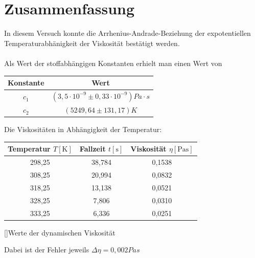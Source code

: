 \documentclass[12pt,a4paper,]{scrreprt}
\begin{document}
\pagebreak
	
	
    
    
	\chapter{Zusammenfassung}
In diesem Versuch konnte die Arrhenius-Andrade-Beziehung der expotentiellen Temperaturabhänigkeit der Viskosität bestätigt werden. \\
\\
Als Wert der stoffabhängigen Konstanten erhielt man einen Wert von
\begin{center}
\begin{tabular}{c|c}
Konstante & Wert \\ \hline
$c_1$ & $(3,5 \cdot 10^{-9} \pm 0,33 \cdot 10^{-9}) Pa \cdot s $ \\
$c_2$ &  $(5249,64 \pm 131,17) K $\\
\end{tabular}
\end{center}

Die Viskositäten in Abhängigkeit der Temperatur:
\begin{center}
   \begin{tabular}{c|c|c}
  		Temperatur $T [\si{\kelvin}]$ & Fallzeit $t [\si{\second}]$ & Viskosität $\eta [\si{\pascal\second}]$ \\ \hline \hline
        298,25 & 38,784	& 0,1538 \\
		308,25 & 20,994	& 0,0832 \\
		318,25 & 13,138	& 0,0521 \\
		328,25 & 7,806	& 0,0310 \\
		333,25 & 6,336	& 0,0251 \\
   \end{tabular}
   []{Werte der dynamischen Viskosität}
   \end{center}
   Dabei ist der Fehler jeweils $\Delta \eta = 0,002 Pas$
   

\pagebreak
\end{document}
